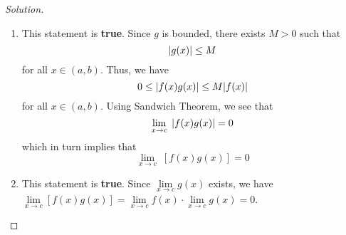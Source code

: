 \documentclass[12pt]{article}
\def\ddfrac#1#2{\displaystyle\frac{\displaystyle #1}{\displaystyle #2}}
\theoremstyle{definition}
\newenvironment{soln}{\begin{proof}[Solution]}{\end{proof}}
\begin{document}
\begin{enumerate}[leftmargin=*]
\begin{soln}
\begin{enumerate}[label = (\roman*), labelwidth=!, labelindent=0pt]
            \item This statement is \textbf{true}. Since $g$ is bounded, there exists $M > 0$ such that
            \[
                \abs{g(x)} \leq M 
            \]
            for all $x \in (a,b)$. Thus, we have 
            \[
                0 \leq \abs{f(x) g(x)} \leq M \abs{f(x)}
            \]
            for all $x \in (a,b)$. Using Sandwich Theorem, we see that
            \[
                \lim_{x \to c} \; \abs{f(x) g(x)} = 0
            \]
            which in turn implies that
            \[
                \lim_{x \to c} \; [f(x) g(x)] = 0
            \]
            
            \item This statement is \textbf{true}. Since $\lim\limits_{x \to c} g(x)$ exists, we have $\lim\limits_{x \to c} \left[ f(x) g(x) \right] = \lim\limits_{x \to c} f(x) \cdot \lim\limits_{x \to c} g(x) = 0$.
        \end{enumerate}
    \end{soln}
    
    
\end{enumerate}
\end{document}

